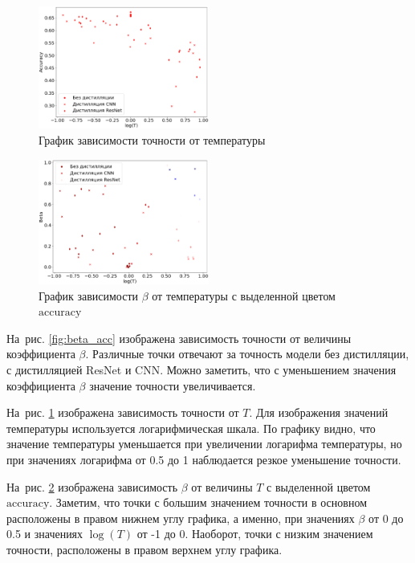 \documentclass[12pt, twoside]{article}
\begin{document}
\begin{figure}[!ht]
    \centering
    \includegraphics[width=0.5\textwidth]{scatter_temp_acc.eps}
    \caption{График зависимости точности от температуры}
    \label{fig:temp_acc}
\end{figure}

\begin{figure}[!ht]
    \centering
    \includegraphics[width=0.5\textwidth]{scatter_temp_beta.eps}
    \caption{График зависимости $\beta$ от температуры с выделенной цветом $\text{accuracy}$}
    \label{fig:temp_beta}
\end{figure}

На~рис. \ref{fig:beta_acc} изображена зависимость точности от величины коэффициента $\beta$. Различные точки отвечают за точность модели без дистилляции, с дистилляцией ResNet и CNN. Можно заметить, что с уменьшением значения коэффициента $\beta$ значение точности увеличивается.

На~рис. \ref{fig:temp_acc} изображена зависимость точности от $T$. Для изображения значений температуры используется логарифмическая шкала. По графику видно, что значение температуры уменьшается при увеличении логарифма температуры, но при значениях логарифма от 0.5 до 1 наблюдается резкое уменьшение точности.

На~рис. \ref{fig:temp_beta} изображена зависимость $\beta$ от величины $T$ с выделенной цветом $\text{accuracy}$. Заметим, что точки с большим значением точности в основном расположены в правом нижнем углу графика, а именно, при значениях $\beta$ от 0 до 0.5 и значениях $\log(T)$ от -1 до 0. Наоборот, точки с низким значением точности, расположены в правом верхнем углу графика.
\end{document}
